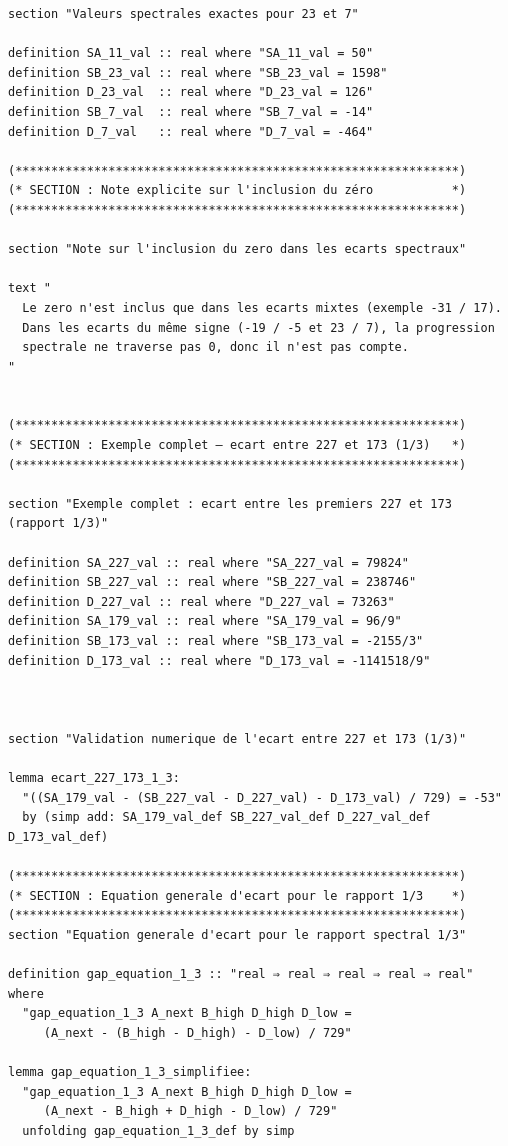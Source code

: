 \documentclass[a4paper,11pt]{article}
\begin{document}
\begin{holcode}[title={\textcolor{white}{Fichier : methode\_spectral.thy -- Partie 6/6 (FIN)}}]
\begin{lstlisting}
section "Valeurs spectrales exactes pour 23 et 7"

definition SA_11_val :: real where "SA_11_val = 50"
definition SB_23_val :: real where "SB_23_val = 1598"
definition D_23_val  :: real where "D_23_val = 126"
definition SB_7_val  :: real where "SB_7_val = -14"
definition D_7_val   :: real where "D_7_val = -464"

(**************************************************************)
(* SECTION : Note explicite sur l'inclusion du zéro           *)
(**************************************************************)

section "Note sur l'inclusion du zero dans les ecarts spectraux"

text "
  Le zero n'est inclus que dans les ecarts mixtes (exemple -31 / 17).
  Dans les ecarts du même signe (-19 / -5 et 23 / 7), la progression
  spectrale ne traverse pas 0, donc il n'est pas compte.
"


(**************************************************************)
(* SECTION : Exemple complet – ecart entre 227 et 173 (1/3)   *)
(**************************************************************)

section "Exemple complet : ecart entre les premiers 227 et 173 (rapport 1/3)"

definition SA_227_val :: real where "SA_227_val = 79824"
definition SB_227_val :: real where "SB_227_val = 238746"
definition D_227_val :: real where "D_227_val = 73263"
definition SA_179_val :: real where "SA_179_val = 96/9"
definition SB_173_val :: real where "SB_173_val = -2155/3"
definition D_173_val :: real where "D_173_val = -1141518/9"



section "Validation numerique de l'ecart entre 227 et 173 (1/3)"

lemma ecart_227_173_1_3:
  "((SA_179_val - (SB_227_val - D_227_val) - D_173_val) / 729) = -53"
  by (simp add: SA_179_val_def SB_227_val_def D_227_val_def D_173_val_def)

(**************************************************************)
(* SECTION : Equation generale d'ecart pour le rapport 1/3    *)
(**************************************************************)
section "Equation generale d'ecart pour le rapport spectral 1/3"

definition gap_equation_1_3 :: "real ⇒ real ⇒ real ⇒ real ⇒ real" where
  "gap_equation_1_3 A_next B_high D_high D_low =
     (A_next - (B_high - D_high) - D_low) / 729"

lemma gap_equation_1_3_simplifiee:
  "gap_equation_1_3 A_next B_high D_high D_low =
     (A_next - B_high + D_high - D_low) / 729"
  unfolding gap_equation_1_3_def by simp


\end{lstlisting}
\end{holcode}
\end{document}
